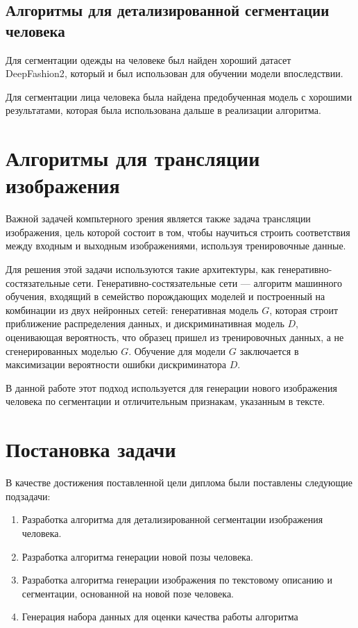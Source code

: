 \documentclass[times,specification,annotation]{itmo-student-thesis}
\begin{document}
\subsection{Алгоритмы для детализированной сегментации человека}

Для сегментации одежды на человеке был найден хороший датасет DeepFashion2\cite{deepfashion2}, который и был использован для обучении модели впоследствии.

Для сегментации лица человека была найдена предобученная модель\cite{dsfd} с хорошими результатами, которая была использована дальше в реализации алгоритма.

\section{Алгоритмы для трансляции изображения}\label{sec:2}

Важной задачей компьтерного зрения является также задача трансляции изображения, цель которой состоит в том, чтобы научиться строить соответствия между входным и выходным изображениями, используя тренировочные данные. 

Для решения этой задачи используются такие архитектуры, как генеративно-состязательные сети.
Генеративно-состязательные сети — алгоритм машинного обучения, входящий в семейство порождающих моделей и построенный на комбинации из двух нейронных сетей: генеративная модель $G$, которая строит приближение распределения данных, и дискриминативная модель $D$, оценивающая вероятность, что образец пришел из тренировочных данных, а не сгенерированных моделью $G$. Обучение для модели $G$ заключается в максимизации вероятности ошибки дискриминатора $D$.

В данной работе этот подход используется для генерации нового изображения человека по сегментации и отличительным признакам, указанным в тексте.

\section{Постановка задачи}\label{sec:2}

В качестве достижения поставленной цели диплома были поставлены следующие подзадачи:
\begin{enumerate}
    \item Разработка алгоритма для детализированной сегментации изображения человека.
    \item Разработка алгоритма генерации новой позы человека.
    \item Разработка алгоритма генерации изображения по текстовому описанию и сегментации, основанной на новой позе человека.
    \item Генерация набора данных для оценки качества работы алгоритма
\end{enumerate}
\end{document}
